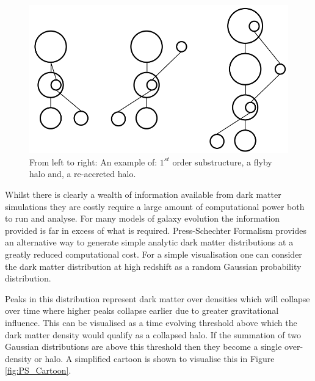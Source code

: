 \begin{figure}[h]
	\centering
	\includegraphics[width = \linewidth]{Figures/Chapter1/Substructures.png}
    \caption{From left to right: An example of: $1^{st}$ order substructure, a flyby halo and, a re-accreted halo.}
	\label{fig:Substructures}
\end{figure}

Whilst there is clearly a wealth of information available from dark matter simulations they are costly require a large amount of computational power both to run and analyse. For many models of galaxy evolution the information provided is far in excess of what is required. Press-Schechter Formalism \citep{Press1974} provides an alternative way to generate simple analytic dark matter distributions at a greatly reduced computational cost. For a simple visualisation one can consider the dark matter distribution at high redshift as a random Gaussian probability distribution. 


Peaks in this distribution represent dark matter over densities which will collapse over time where higher peaks collapse earlier due to greater gravitational influence. This can be visualised as a time evolving threshold above which the dark matter density would qualify as a collapsed halo. If the summation of two Gaussian distributions are above this threshold then they become a single over-density or halo. A simplified cartoon is shown to visualise this in Figure \ref{fig:PS_Cartoon}.


